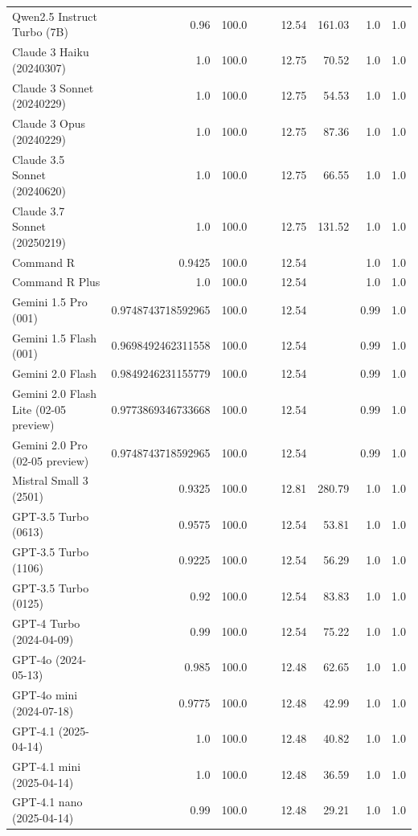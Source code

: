 \begin{table}[htp]
{\begin{tabular}{lrrrrrrrr}
Qwen2.5 Instruct Turbo (7B) & 0.96 & 100.0 &  &  & 12.54 & 161.03 & 1.0 & 1.0 \\
Claude 3 Haiku (20240307) & 1.0 & 100.0 &  &  & 12.75 & 70.52 & 1.0 & 1.0 \\
Claude 3 Sonnet (20240229) & 1.0 & 100.0 &  &  & 12.75 & 54.53 & 1.0 & 1.0 \\
Claude 3 Opus (20240229) & 1.0 & 100.0 &  &  & 12.75 & 87.36 & 1.0 & 1.0 \\
Claude 3.5 Sonnet (20240620) & 1.0 & 100.0 &  &  & 12.75 & 66.55 & 1.0 & 1.0 \\
Claude 3.7 Sonnet (20250219) & 1.0 & 100.0 &  &  & 12.75 & 131.52 & 1.0 & 1.0 \\
Command R & 0.9425 & 100.0 &  &  & 12.54 &  & 1.0 & 1.0 \\
Command R Plus & 1.0 & 100.0 &  &  & 12.54 &  & 1.0 & 1.0 \\
Gemini 1.5 Pro (001) & 0.9748743718592965 & 100.0 &  &  & 12.54 &  & 0.99 & 1.0 \\
Gemini 1.5 Flash (001) & 0.9698492462311558 & 100.0 &  &  & 12.54 &  & 0.99 & 1.0 \\
Gemini 2.0 Flash & 0.9849246231155779 & 100.0 &  &  & 12.54 &  & 0.99 & 1.0 \\
Gemini 2.0 Flash Lite (02-05 preview) & 0.9773869346733668 & 100.0 &  &  & 12.54 &  & 0.99 & 1.0 \\
Gemini 2.0 Pro (02-05 preview) & 0.9748743718592965 & 100.0 &  &  & 12.54 &  & 0.99 & 1.0 \\
Mistral Small 3 (2501) & 0.9325 & 100.0 &  &  & 12.81 & 280.79 & 1.0 & 1.0 \\
GPT-3.5 Turbo (0613) & 0.9575 & 100.0 &  &  & 12.54 & 53.81 & 1.0 & 1.0 \\
GPT-3.5 Turbo (1106) & 0.9225 & 100.0 &  &  & 12.54 & 56.29 & 1.0 & 1.0 \\
GPT-3.5 Turbo (0125) & 0.92 & 100.0 &  &  & 12.54 & 83.83 & 1.0 & 1.0 \\
GPT-4 Turbo (2024-04-09) & 0.99 & 100.0 &  &  & 12.54 & 75.22 & 1.0 & 1.0 \\
GPT-4o (2024-05-13) & 0.985 & 100.0 &  &  & 12.48 & 62.65 & 1.0 & 1.0 \\
GPT-4o mini (2024-07-18) & 0.9775 & 100.0 &  &  & 12.48 & 42.99 & 1.0 & 1.0 \\
GPT-4.1 (2025-04-14) & 1.0 & 100.0 &  &  & 12.48 & 40.82 & 1.0 & 1.0 \\
GPT-4.1 mini (2025-04-14) & 1.0 & 100.0 &  &  & 12.48 & 36.59 & 1.0 & 1.0 \\
GPT-4.1 nano (2025-04-14) & 0.99 & 100.0 &  &  & 12.48 & 29.21 & 1.0 & 1.0 \\

\end{tabular}}
\end{table}
